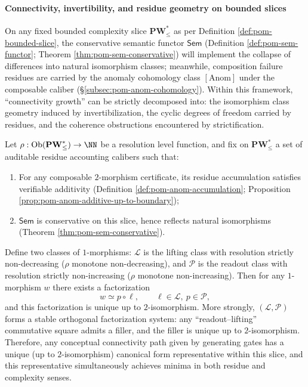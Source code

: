 
\paragraph{Connectivity, invertibility, and residue geometry on bounded slices}
On any fixed bounded complexity slice \(\mathbf{PW}^{\ast}_{\le}\) as per Definition \ref{def:pom-bounded-slice}, the conservative semantic functor \(\mathsf{Sem}\) (Definition \ref{def:pom-sem-functor}; Theorem \ref{thm:pom-sem-conservative}) will implement the collapse of differences into natural isomorphism classes;
meanwhile, composition failure residues are carried by the anomaly cohomology class \([\mathrm{Anom}]\) under the composable caliber (\S\ref{subsec:pom-anom-cohomology}).
Within this framework, ``connectivity growth'' can be strictly decomposed into: the isomorphism class geometry induced by invertibilization, the cyclic degrees of freedom carried by residues, and the coherence obstructions encountered by strictification.

\begin{conclusion}\label{con:xi-connectivity-orthogonal-factorization-normal-form}
Let \(\rho:\mathrm{Ob}(\mathbf{PW}^{\ast}_{\le})\to\NN\) be a resolution level function, and fix on \(\mathbf{PW}^{\ast}_{\le}\) a set of auditable residue accounting calibers such that:
\begin{enumerate}
  \item For any composable \(2\)-morphism certificate, its residue accumulation satisfies verifiable additivity (Definition \ref{def:pom-anom-accumulation}; Proposition \ref{prop:pom-anom-additive-up-to-boundary});
  \item \(\mathsf{Sem}\) is conservative on this slice, hence reflects natural isomorphisms (Theorem \ref{thm:pom-sem-conservative}).
\end{enumerate}
Define two classes of \(1\)-morphisms: \(\mathcal L\) is the lifting class with resolution strictly non-decreasing (\(\rho\) monotone non-decreasing), and \(\mathcal P\) is the readout class with resolution strictly non-increasing (\(\rho\) monotone non-increasing).
Then for any \(1\)-morphism \(w\) there exists a factorization
\[
w\simeq p\circ \ell,\qquad \ell\in\mathcal L,\ p\in\mathcal P,
\]
and this factorization is unique up to \(2\)-isomorphism.
More strongly, \((\mathcal L,\mathcal P)\) forms a stable orthogonal factorization system: any ``readout--lifting'' commutative square admits a filler, and the filler is unique up to \(2\)-isomorphism.
Therefore, any conceptual connectivity path given by generating gates has a unique (up to \(2\)-isomorphism) canonical form representative within this slice, and this representative simultaneously achieves minima in both residue and complexity senses.
\end{conclusion}

